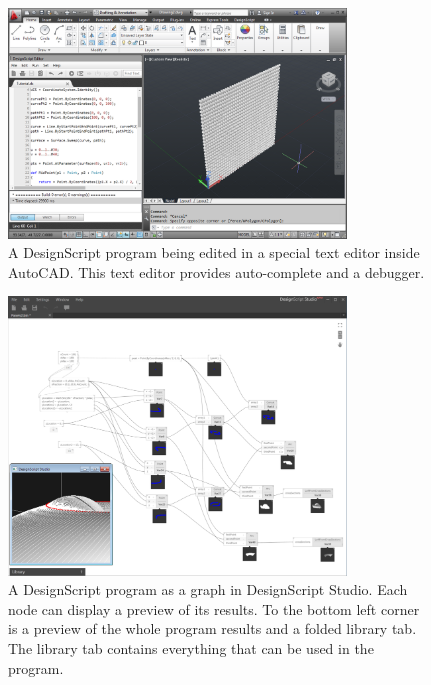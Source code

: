 \begin{figure}
	\centering
	\includegraphics[width=0.8\textwidth]{images/ds_autocad}
	\caption{A DesignScript program being edited in a special text editor inside AutoCAD. This text editor provides auto-complete and a debugger.}
	\label{fig:ds:autocad}
\end{figure}

\begin{figure}
	\centering
	\includegraphics[width=0.8\textwidth]{images/ds_dsstudio}
	\caption{A DesignScript program as a graph in DesignScript Studio. Each node can display a preview of its results. To the bottom left corner is a preview of the whole program results and a folded library tab. The library tab contains everything that can be used in the program.}
	\label{fig:ds:dsstudio}
\end{figure}

